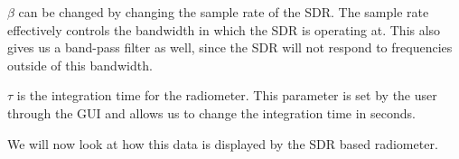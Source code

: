 
$\beta$ can be changed by changing the sample rate of the SDR.  The sample rate effectively controls the bandwidth in which the SDR is operating at.  This also gives us a band-pass filter as well, since the SDR will not respond to frequencies outside of this bandwidth.  

$\tau$ is the integration time for the radiometer.  This parameter is set by the user through the GUI and allows us to change the integration time in seconds.

We will now look at how this data is displayed by the SDR based radiometer.




